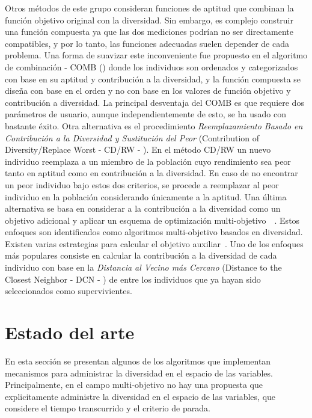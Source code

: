 Otros métodos de este grupo consideran funciones de aptitud que combinan la función objetivo original con la diversidad.
%
Sin embargo, es complejo construir una función compuesta ya que las dos mediciones podrían no ser directamente compatibles,
y por lo tanto, las funciones adecuadas suelen depender de cada problema.
%
Una forma de suavizar este inconveniente fue propuesto en el algoritmo de combinación - COMB (\cite{vidal2013hybrid}) donde los individuos son ordenados y categorizados con base en su aptitud y contribución a la diversidad, y la función compuesta se diseña con base en el orden y no con base en los valores de función objetivo y contribución a diversidad.
%
La principal desventaja del COMB es que requiere dos parámetros de usuario, aunque independientemente de esto, se ha usado con bastante éxito.
%
Otra alternativa es el procedimiento \textit{Reemplazamiento Basado en Contribución a la Diversidad y Sustitución del Peor} 
(Contribution of Diversity/Replace Worst - CD/RW - \cite{lozano2008replacement}).
%
En el método CD/RW un nuevo individuo reemplaza a un miembro de la población cuyo rendimiento sea peor tanto en aptitud como en contribución a la diversidad.
%
En caso de no encontrar un peor individuo bajo estos dos criterios, se procede a reemplazar al peor individuo en la población considerando únicamente a la aptitud.
%
Una última alternativa se basa en considerar a la contribución a la diversidad como un objetivo adicional y aplicar un esquema de 
optimización multi-objetivo~\cite{bui2005multiobjective}~\cite{mouret2011novelty}.
%
Estos enfoques son identificados como algoritmos multi-objetivo basados en diversidad.
%
Existen varias estrategias para calcular el objetivo auxiliar~\cite{segura2013using}.
%
Uno de los enfoques más populares consiste en calcular la contribución a la diversidad de cada individuo con base en 
la \textit{Distancia al Vecino más Cercano} (Distance to the Closest Neighbor - DCN - \cite{segura2016novel}) de entre los individuos que ya hayan sido seleccionados
como supervivientes.

\section{Estado del arte}

En esta sección se presentan algunos de los algoritmos que implementan mecanismos para administrar la diversidad en el espacio de las variables.
%
Principalmente, en el campo multi-objetivo no hay una propuesta que explicitamente administre la diversidad en el espacio de las variables, que considere el tiempo transcurrido y el criterio de parada.
%


